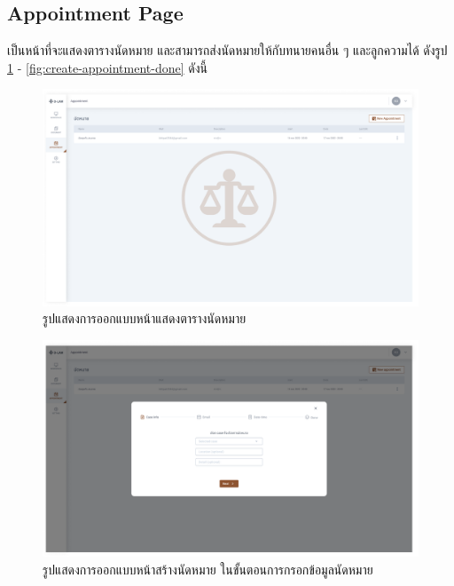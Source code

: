 \documentclass[12pt,oneside,openright,a4paper]{cpe-thai-project}
\begin{document}
\subsection{Appointment Page}
\hspace*{1cm} เป็นหน้าที่จะแสดงตารางนัดหมาย และสามารถส่งนัดหมายให้กับทนายคนอื่น ๆ และลูกความได้ ดังรูป \ref{fig:appointment} - \ref{fig:create-appointment-done} ดังนี้
\begin{figure}[!h]\centering
  \includegraphics[width=13cm]{./assets/userinterface/appointment.png}
  \caption{รูปแสดงการออกแบบหน้าแสดงตารางนัดหมาย}\label{fig:appointment}
\end{figure}

\clearpage

\begin{figure}[!h]\centering
  \includegraphics[width=13cm]{./assets/userinterface/create-appointment-info.png}
  \caption{รูปแสดงการออกแบบหน้าสร้างนัดหมาย ในขั้นตอนการกรอกข้อมูลนัดหมาย}\label{fig:create-appointment-info}
\end{figure}
\end{document}
